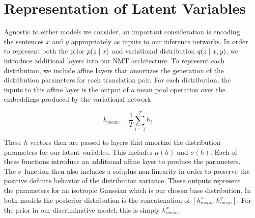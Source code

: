 



\section{Representation of Latent Variables}

Agnostic to either models we consider, an important consideration is encoding the sentences $x$ and $y$ appropriately as inputs to our inference networks. In order to represent both the prior $p(z \; | \;{x})$ and variational distribution $q(z \; | \;{x, y})$, we introduce additional layers into our \ac{NMT} architecture. To represent each distribution, we include affine layers that amortizes the generation of the distribution parameters for each translation pair. For each distribution, the inputs to this affine layer is the output of a mean pool operation over the embeddings produced by the variational network

\begin{equation}
h_{mean} = \frac{1}{T} \sum_{i=1}^{T} h_{i}
\end{equation}

These $h$ vectors then are passed to layers that amortize the distribution parameters for our latent variables. This includes $\mu(h)$ and $\sigma(h)$. Each of these functions introduce an additional affine layer to produce the parameters. The $\sigma$ function then also includes a softplus non-linearity in order to preserve the positive definite behavior of the distribution variance. These outputs represent the parameters for an isotropic Gaussian which is our chosen base distribution. In both models the posterior distribution is the concatenation of $[h_{mean}^{x} ; h_{mean}^{y}]$. For the prior in our discriminative model, this is simply $h_{mean}^{x}$.


